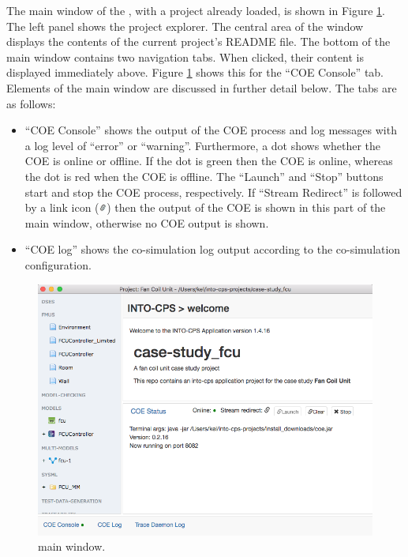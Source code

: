 The main window of the \intoapp{}, with a project already loaded, is shown in Figure \ref{fig:app-main}.
%
The left panel shows the \into project explorer.
%
The central area of the window displays the contents of the current project's README file.
%
The bottom of the main \intoapp{} window contains two navigation tabs.
%
When clicked, their content is displayed immediately above.
%
Figure \ref{fig:app-main} shows this for the ``COE Console'' tab.
%
Elements of the main window are discussed in further detail below.
%
The tabs are as follows:
%
%
%
\begin{itemize}
\item  ``COE Console'' shows the output of the COE process and log messages with a log level of ``error'' or ``warning''. Furthermore, a dot shows whether the COE is online or offline. If the dot is green then the COE is online, whereas the dot is red when the COE is offline.  The ``Launch'' and ``Stop'' buttons start and stop the COE process, respectively.  If ``Stream Redirect'' is followed by a link icon (\includegraphics[width=0.1in]{./figures/app/link}) then the output of the COE is shown in this part of the main window, otherwise no COE output is shown.
%
\item  ``COE log'' shows the co-simulation log output according to the co-simulation configuration.
\end{itemize}
%
%
%
\begin{figure}[ht]
\centering
\includegraphics[width=\textwidth]{./figures/app/main}
\caption{\intoapp{} main window.}
\label{fig:app-main}
\end{figure}
%
%
%
